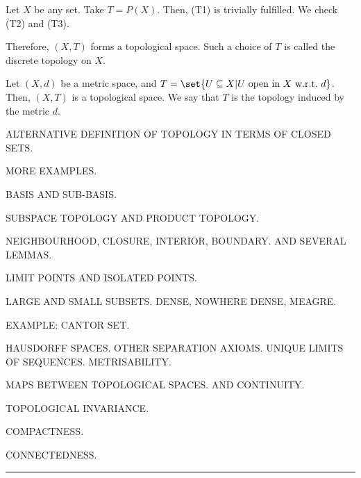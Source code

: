 \documentclass[draft]{penrose}
\begin{document}
\begin{negg}
  Let $X$ be any set. Take $T = P(X)$. Then, (T1) is trivially fulfilled. We check (T2) and (T3).

  Therefore, $(X,T)$ forms a topological space. Such a choice of $T$ is called the discrete topology on $X$.
\end{negg}



\begin{negg}
  Let $(X,d)$ be a metric space, and $T = \set{U \subseteq X | U\ \text{open in}\ X\ \text{w.r.t.}\ d}$. Then, $(X,T)$ is a topological space. We say that $T$ is the topology induced by the metric $d$.
\end{negg}

ALTERNATIVE DEFINITION OF TOPOLOGY IN TERMS OF CLOSED SETS.

MORE EXAMPLES.

BASIS AND SUB-BASIS.

SUBSPACE TOPOLOGY AND PRODUCT TOPOLOGY.


NEIGHBOURHOOD, CLOSURE, INTERIOR, BOUNDARY. AND SEVERAL LEMMAS.

LIMIT POINTS AND ISOLATED POINTS.

LARGE AND SMALL SUBSETS. DENSE, NOWHERE DENSE, MEAGRE.

EXAMPLE: CANTOR SET.

HAUSDORFF SPACES. OTHER SEPARATION AXIOMS. UNIQUE LIMITS OF SEQUENCES. METRISABILITY.

MAPS BETWEEN TOPOLOGICAL SPACES. AND CONTINUITY.

TOPOLOGICAL INVARIANCE.

COMPACTNESS.

CONNECTEDNESS.

\begin{center}
  \vspace*{0.5em}
  \rule{0.8\textwidth}{0.8pt}
\end{center}

\nocite{*}
{\small }
\end{document}
